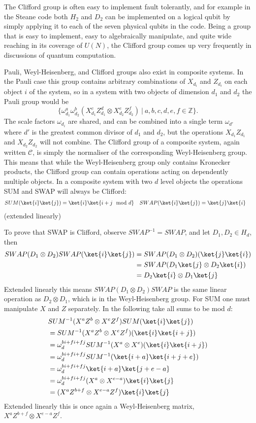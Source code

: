 The Clifford group is often easy to implement fault tolerantly, and for example in the Steane code \cite{steane-code} both $H_2$ and $D_2$ can be implemented on a logical qubit by simply applying it to each of the seven physical qubits in the code. Being a group that is easy to implement, easy to algebraically manipulate, and quite wide reaching in its coverage of $U(N)$, the Clifford group comes up very frequently in discussions of quantum computation.

Pauli, Weyl-Heisenberg, and Clifford groups also exist in composite systems. In the Pauli case this group contains arbitrary combinations of $X_{d_i}$ and $Z_{d_i}$ on each object $i$ of the system, so in a system with two objects of dimension $d_1$ and $d_2$ the Pauli group would be
\[\{\omega_{d_1}^a\omega_{d_2}^b(X_{d_1}^cZ_{d_1}^d\otimes X_{d_2}^eZ_{d_2}^f)\ |\ a, b, c, d, e, f \in \mathbb{Z}\}.\]
The scale factors $\omega_{d_i}$ are shared, and can be combined into a single term $\omega_{d'}$ where $d'$ is the greatest common divisor of $d_1$ and $d_2$, but the operations $X_{d_1}Z_{d_1}$ and $X_{d_2}Z_{d_2}$ will not combine. The Clifford group of a composite system, again written $\mathcal{C}$, is simply the normaliser of the corresponding Weyl-Heisenberg group. This means that while the Weyl-Heisenberg group only contains Kronecker products, the Clifford group can contain operations acting on dependently multiple objects. In a composite system with two $d$ level objects the operations SUM and SWAP will always be Clifford:
\begin{align*}
	SUM(\ket{i}\ket{j}) = \ket{i}\ket{i+j \mod d} &&& SWAP(\ket{i}\ket{j}) = \ket{j}\ket{i}
\end{align*}
(extended linearly)

To prove that SWAP is Clifford, observe $SWAP^{-1} = SWAP$, and let $D_1, D_2 \in H_d$, then
\begin{align*}
SWAP (D_1 \otimes D_2) SWAP (\ket{i}\ket{j})
&= SWAP (D_1 \otimes D_2)(\ket{j}\ket{i})
\\&=SWAP (D_1\ket{j} \otimes D_2\ket{i})
\\&=D_2\ket{i} \otimes D_1\ket{j}
\end{align*}
Extended linearly this means $SWAP (D_1 \otimes D_2) SWAP$ is the same linear operation as $D_2 \otimes D_1$, which is in the Weyl-Heisenberg group. For SUM one must manipulate $X$ and $Z$ separately. In the following take all sums to be mod $d$:
\begin{align*}
&SUM^{-1} (X^aZ^b \otimes X^eZ^f) SUM (\ket{i}\ket{j})
\\&=SUM^{-1} (X^aZ^b \otimes X^eZ^f) (\ket{i}\ket{i+j})
\\&=\omega_d^{bi+fi+fj}SUM^{-1}(X^a \otimes X^e) (\ket{i}\ket{i+j})
\\&=\omega_d^{bi+fi+fj}SUM^{-1} (\ket{i+a}\ket{i+j+e})
\\&=\omega_d^{bi+fi+fj}\ket{i+a}\ket{j+e-a}
\\&=\omega_d^{bi+fi+fj}(X^a \otimes X^{e-a})\ket{i}\ket{j}
\\&=(X^aZ^{b+f} \otimes X^{e-a}Z^f)\ket{i}\ket{j}
\end{align*}
Extended linearly this is once again a Weyl-Heisenberg matrix, $X^aZ^{b+f} \otimes X^{e-a}Z^f$.

